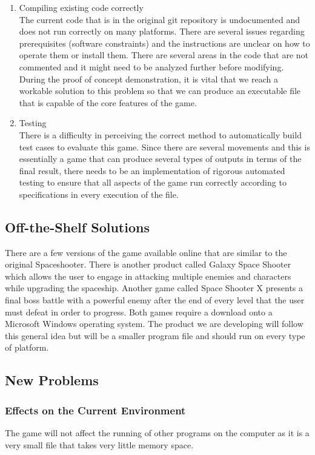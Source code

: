 \documentclass[12pt, titlepage]{article}
\begin{document}
\begin{enumerate}
\item Compiling existing code correctly
\smallskip
\\The current code that is in the original git repository is undocumented and does not run correctly on many platforms. There are several issues regarding prerequisites (software constraints) and the instructions are unclear on how to operate them or install them. There are several areas in the code that are not commented and it might need to be analyzed further before modifying. During the proof of concept demonstration, it is vital that we reach a workable solution to this problem so that we can produce an executable file that is capable of the core features of the game. 

\item Testing
\smallskip
\\There is a difficulty in perceiving the correct method to automatically build test cases to evaluate this game. Since there are several movements and this is essentially a game that can produce several types of outputs in terms of the final result, there needs to be an implementation of rigorous automated testing to ensure that all aspects of the game run correctly according to specifications in every execution of the file.

\end{enumerate}

\subsection{Off-the-Shelf Solutions}
There are a few versions of the game available online that are similar to the original Spaceshooter. There is another product called Galaxy Space Shooter which allows the user to engage in attacking multiple enemies and characters while upgrading the spaceship. Another game called Space Shooter X presents a final boss battle with a powerful enemy after the end of every level that the user must defeat in order to progress. Both games require a download onto a Microsoft Windows operating system. The product we are developing will follow this general idea but will be a smaller program file and should run on every type of platform. 

\subsection{New Problems}

\subsubsection{Effects on the Current Environment}
The game will not affect the running of other programs on the computer as it is a very small file that takes very little memory space. 
\end{document}
